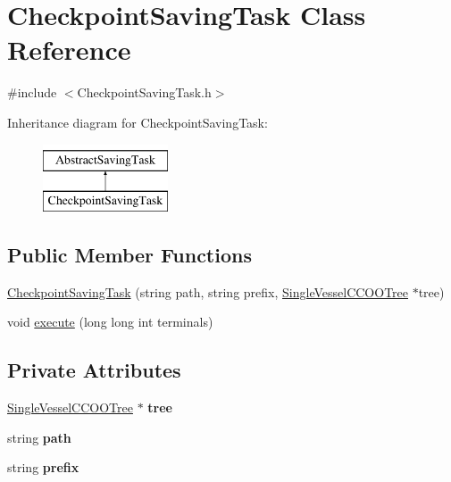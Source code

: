 \hypertarget{class_checkpoint_saving_task}{}\section{Checkpoint\+Saving\+Task Class Reference}
\label{class_checkpoint_saving_task}


{\ttfamily \#include $<$Checkpoint\+Saving\+Task.\+h$>$}

Inheritance diagram for Checkpoint\+Saving\+Task\+:\begin{figure}[H]
\begin{center}
\leavevmode
\includegraphics[height=2.000000cm]{d8/d08/class_checkpoint_saving_task}
\end{center}
\end{figure}
\subsection*{Public Member Functions}
\begin{DoxyCompactItemize}
\item 
\hyperlink{class_checkpoint_saving_task_aecde19cadd1ba092b96944eca86684f1}{Checkpoint\+Saving\+Task} (string path, string prefix, \hyperlink{class_single_vessel_c_c_o_o_tree}{Single\+Vessel\+C\+C\+O\+O\+Tree} $\ast$tree)
\item 
void \hyperlink{class_checkpoint_saving_task_a9c2ed33439fab8564b26e5b3396a8008}{execute} (long long int terminals)
\end{DoxyCompactItemize}
\subsection*{Private Attributes}
\begin{DoxyCompactItemize}
\item 
\hyperlink{class_single_vessel_c_c_o_o_tree}{Single\+Vessel\+C\+C\+O\+O\+Tree} $\ast$ {\bfseries tree}\hypertarget{class_checkpoint_saving_task_a174c080cabea9e68e3a7e1f5123fe252}{}\label{class_checkpoint_saving_task_a174c080cabea9e68e3a7e1f5123fe252}

\item 
string {\bfseries path}\hypertarget{class_checkpoint_saving_task_af927d8fde7306da51808d46cd4c685f0}{}\label{class_checkpoint_saving_task_af927d8fde7306da51808d46cd4c685f0}

\item 
string {\bfseries prefix}\hypertarget{class_checkpoint_saving_task_a73faeac9133baf2de1a951e1ceb177f9}{}\label{class_checkpoint_saving_task_a73faeac9133baf2de1a951e1ceb177f9}

\end{DoxyCompactItemize}


